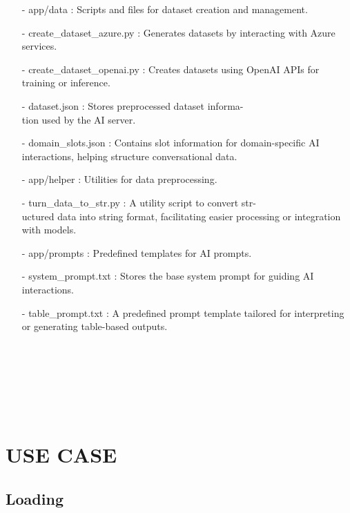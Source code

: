 \documentclass[conference]{IEEEtran}
\begin{document}
\begin{enumerate}
        \item[-] app/data : Scripts and files for dataset creation and management.\\
        \item[-] create\_dataset\_azure.py : Generates datasets by interacting with Azure services.\\
        \item[-] create\_dataset\_openai.py : Creates datasets using OpenAI APIs for training or inference.\\
        \item[-] dataset.json : Stores preprocessed dataset informa-\\tion used by the AI server.\\
        \item[-] domain\_slots.json : Contains slot information for domain-specific AI interactions, helping structure conversational data.\\
        
        \item[-] app/helper : Utilities for data preprocessing.\\
        \item[-] turn\_data\_to\_str.py : A utility script to convert str-\\uctured data into string format, facilitating easier processing or integration with models.\\
        
        \item[-] app/prompts : Predefined templates for AI prompts.\\
        \item[-] system\_prompt.txt : Stores the base system prompt for guiding AI interactions.\\
        \item[-] table\_prompt.txt : A predefined prompt template tailored for interpreting or generating table-based outputs. \\ \\ \\ \\ \\ \\ \\
\end{enumerate}

\section{USE CASE}
\subsection{Loading}
\end{document}
